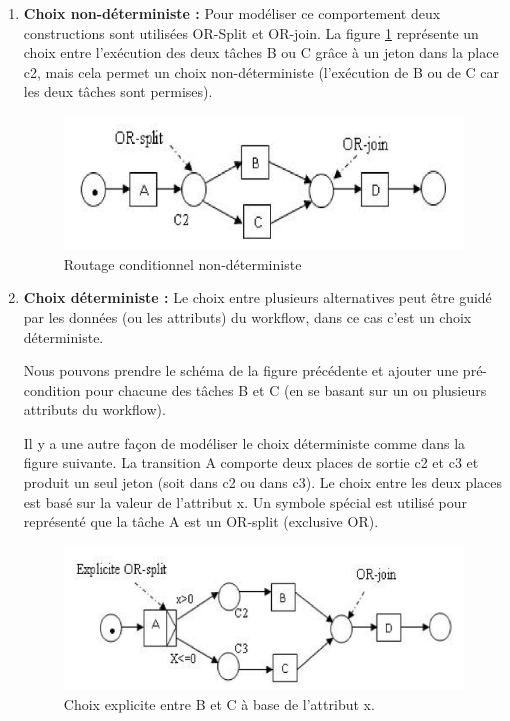 \begin{enumerate}
	
	\item \textbf{Choix non-déterministe :} Pour modéliser ce comportement deux constructions sont utilisées OR-Split et OR-join. La figure \ref{fig:wf005} représente un choix entre l’exécution des deux tâches B ou C grâce à un jeton dans la place c2, mais cela permet un choix non-déterministe (l’exécution de B ou de C car les deux tâches sont permises).
	
	
	
	\begin{figure}[H]
		\centering
		\includegraphics[width=0.7\linewidth]{images/wf005}
		\caption{Routage conditionnel non-déterministe}
		\label{fig:wf005}
	\end{figure}
	
	
	
	\item \textbf{Choix déterministe : } Le choix entre plusieurs alternatives peut être guidé par les données (ou les attributs) du workflow, dans ce cas c’est un choix déterministe.
	
	Nous pouvons prendre le schéma de la figure précédente et ajouter une pré-condition pour chacune des tâches B et C (en se basant sur un ou plusieurs attributs du workflow).
	
	Il y a une autre façon de modéliser le choix déterministe comme dans la figure suivante. La transition A comporte deux places de sortie c2 et c3 et produit un seul jeton (soit dans c2 ou dans c3). Le choix entre les deux places est basé sur la valeur de l’attribut x. Un symbole spécial est utilisé pour représenté que la tâche A est un OR-split (exclusive OR).
	
	
	\begin{figure}[H]
		\centering
		\includegraphics[width=0.7\linewidth]{images/wf006}
		\caption{Choix explicite entre B et C à base de l’attribut x. 
		}
		\label{fig:wf006}
	\end{figure}
	

\end{enumerate}
